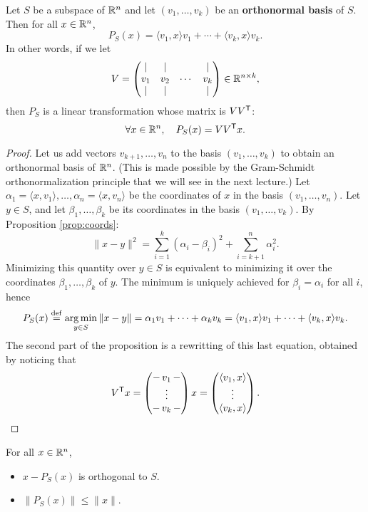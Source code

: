 \documentclass[11pt,nocut]{article}
\begin{document}
\begin{proposition}\label{prop:ortho}
	Let $S$ be a subspace of $\mathbb{R}^n$ and let $(v_1, \dots, v_k)$ be an \textbf{orthonormal basis} of $S$. Then for all $x \in \mathbb{R}^n$,
		$$P_S(x) = \langle v_1, x \rangle v_1 + \cdots + \langle v_k, x \rangle v_k.$$
		In other words, if we let
		$$
		V = 
\begin{pmatrix}
	| & | & & | \\
	v_1 & v_2 & \cdots& v_k \\
	| & | & & |
\end{pmatrix}
\in \mathbb{R}^{n \times k},
		$$
		then $P_S$ is a linear transformation whose matrix is $VV^{{\sf T}}$:
		$$
		\forall x \in \mathbb{R}^n, \quad P_S(x) = V V^{{\sf T}} x.
		$$
\end{proposition}
\begin{proof}
	Let us add vectors $v_{k+1}, \dots, v_n$ to the basis $(v_1, \dots, v_k)$ to obtain an orthonormal basis of $\mathbb{R}^n$. (This is made possible by the Gram-Schmidt orthonormalization principle that we will see in the next lecture.)
	Let $\alpha_1 = \langle x, v_1 \rangle, \dots, \alpha_n = \langle x , v_n \rangle$ be the coordinates of $x$ in the basis $(v_1, \dots, v_n)$.
	Let $y \in S$, and let $\beta_1, \dots, \beta_k$ be its coordinates in the basis $(v_1, \dots, v_k)$. By Proposition \ref{prop:coords}:
	$$
	\|x-y\|^2 = \sum_{i=1}^k (\alpha_i - \beta_i)^2 + \sum_{i=k+1}^n \alpha_i^2.
	$$
	Minimizing this quantity over $y \in S$ is equivalent to minimizing it over the coordinates $\beta_1, \dots, \beta_k$ of $y$. The minimum is uniquely achieved for $\beta_i = \alpha_i$ for all $i$, hence
	$$
	P_S(x) \overset{\rm def}{=} \operatorname*{arg\,min}_{y \in S} \|x - y\|
	= \alpha_1 v_1 + \dots + \alpha_k v_k
	= \langle v_1, x \rangle v_1 + \dots + \langle v_k, x \rangle v_k.
	$$
	The second part of the proposition is a rewritting of this last equation, obtained by noticing that
	$$
	V^{{\sf T}} x 
	= 
\begin{pmatrix}
	- \, v_1 \, -\\
	\vdots\\
	- \, v_k \,-
\end{pmatrix}
x
=
\begin{pmatrix}
	\langle v_1, x \rangle \\
	\vdots \\
	\langle v_k, x \rangle
\end{pmatrix}.
	$$
\end{proof}

\begin{corollary}
	For all $x \in \mathbb{R}^n$,
	\begin{itemize}
		\item $x - P_S(x)$ is orthogonal to $S$.
		\item $\|P_S(x) \| \leq \|x\|$.
	\end{itemize}
\end{corollary}
\end{document}
